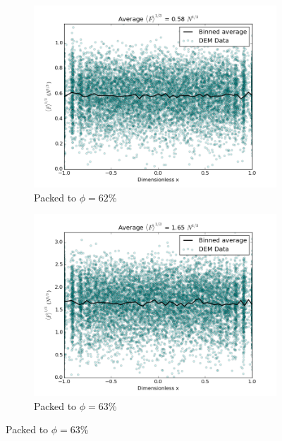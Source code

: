 \begin{figure}[!ht]
    \centering
    \begin{subfigure}[b]{0.4\textwidth}
        \centering
        \includegraphics[width=\textwidth]{figures/initial_packing_study/62-deform-force-profile.png}
        \caption{Packed to $\phi = 62$\%}
    \end{subfigure}
    
    \begin{subfigure}[b]{0.4\textwidth}
        \centering
        \includegraphics[width=\textwidth]{figures/initial_packing_study/63-deform-force-profile.png}
        \caption{Packed to $\phi = 63$\%}
    \end{subfigure}


\end{figure}
